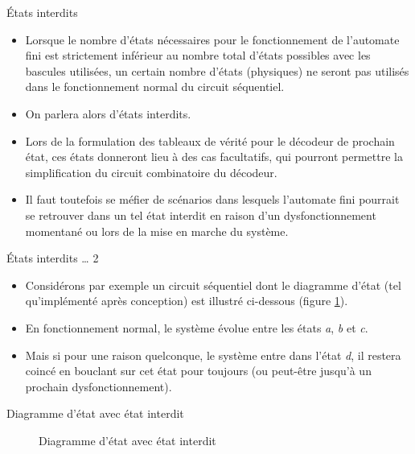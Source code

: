 \documentclass[presentation]{beamer}
\begin{document}
\begin{frame}[label={sec:org3ca6538}]{États interdits}
\begin{itemize}
\item Lorsque le nombre d'états nécessaires pour le fonctionnement de l'automate fini est strictement inférieur au nombre total d'états possibles avec les bascules utilisées, un certain nombre d'états (physiques) ne seront pas utilisés dans le fonctionnement normal du circuit séquentiel.

\item On parlera alors d'\alert{états interdits}.

\item Lors de la formulation des tableaux de vérité pour le décodeur de prochain état, ces états donneront lieu à des cas facultatifs, qui pourront permettre la simplification du circuit combinatoire du décodeur.

\item Il faut toutefois se méfier de scénarios dans lesquels l'automate fini pourrait se retrouver dans un tel état interdit en raison d'un dysfonctionnement momentané ou lors de la mise en marche du système.
\end{itemize}
\end{frame}

\begin{frame}[label={sec:org06bd6dc}]{États interdits \ldots{} 2}
\begin{itemize}
\item Considérons par exemple un circuit séquentiel dont le diagramme d'état (tel qu'implémenté après conception) est illustré ci-dessous (figure \ref{fig:orgd988bfe}).

\item En fonctionnement normal, le système évolue entre les états \emph{a}, \emph{b} et \emph{c}.

\item Mais si pour une raison quelconque, le système entre dans l'état \emph{d}, il restera coincé en bouclant sur cet état pour toujours (ou peut-être jusqu'à un prochain dysfonctionnement).
\end{itemize}
\end{frame}

\begin{frame}[label={sec:org063049c}]{Diagramme d'état avec état interdit}
\begin{figure}[htbp]
\centering

\caption{\label{fig:orgd988bfe}Diagramme d'état avec état interdit}
\end{figure}
\end{frame}
\end{document}
